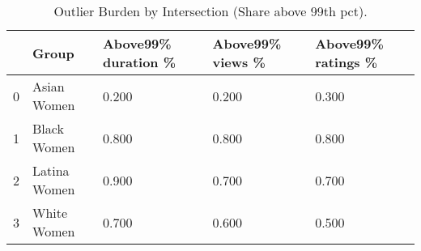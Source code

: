 \begin{table}[htbp]
\centering
\caption{Outlier Burden by Intersection (Share above 99th pct).}
\label{tab:eda_outlier_burden}
\begin{tabular}{lllll}
\toprule
 & Group & Above99\% duration \% & Above99\% views \% & Above99\% ratings \% \\
\midrule
0 & Asian Women & 0.200 & 0.200 & 0.300 \\
1 & Black Women & 0.800 & 0.800 & 0.800 \\
2 & Latina Women & 0.900 & 0.700 & 0.700 \\
3 & White Women & 0.700 & 0.600 & 0.500 \\
\bottomrule
\end{tabular}

\end{table}